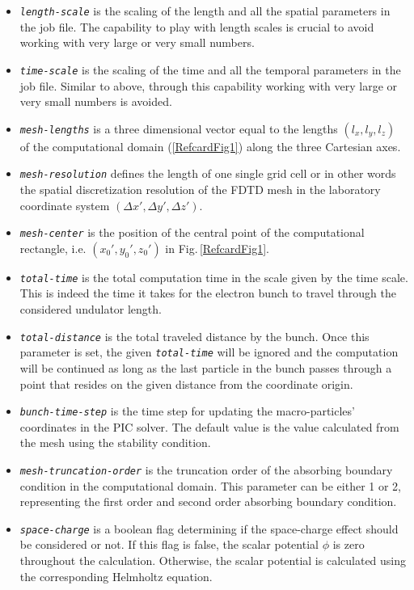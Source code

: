 \begin{itemize}
	\item {\tt \em \small length-scale} is the scaling of the length and all the spatial parameters in the job file. The capability to play with length scales is crucial to avoid working with very large or very small numbers.
	\item {\tt \em \small time-scale} is the scaling of the time and all the temporal parameters in the job file. Similar to above, through this capability working with very large or very small numbers is avoided.
	\item {\tt \em \small mesh-lengths} is a three dimensional vector equal to the lengths $(l_x,l_y,l_z)$ of the computational domain (\ref{RefcardFig1}) along the three Cartesian axes.
	\item {\tt \em \small mesh-resolution} defines the length of one single grid cell or in other words the spatial discretization resolution of the FDTD mesh in the laboratory coordinate system $(\Delta x',\Delta y',\Delta z')$.
	\item {\tt \em \small mesh-center} is the position of the central point of the computational rectangle, i.e. $(x_0',y_0',z_0')$ in Fig.\,\ref{RefcardFig1}.
	\item {\tt \em \small total-time} is the total computation time in the scale given by the time scale. This is indeed the time it takes for the electron bunch to travel through the considered undulator length.
	\item {\tt \em \small total-distance} is the total traveled distance by the bunch. Once this parameter is set, the given {\tt \em \small total-time} will be ignored and the computation will be continued as long as the last particle in the bunch passes through a point that resides on the given distance from the coordinate origin.
	\item {\tt \em \small bunch-time-step} is the time step for updating the macro-particles' coordinates in the PIC solver. The default value is the value calculated from the mesh using the stability condition.
	\item {\tt \em \small mesh-truncation-order} is the truncation order of the absorbing boundary condition in the computational domain. This parameter can be either 1 or 2, representing the first order and second order absorbing boundary condition.
	\item {\tt \em \small space-charge} is a boolean flag determining if the space-charge effect should be considered or not. If this flag is false, the scalar potential $\phi$ is zero throughout the calculation. Otherwise, the scalar potential is calculated using the corresponding Helmholtz equation.

\end{itemize}
